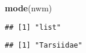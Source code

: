\documentclass[]{article}
\newenvironment{Shaded}{\begin{snugshade}}{\end{snugshade}}
\newcommand{\DecValTok}[1]{\textcolor[rgb]{0.00,0.00,0.81}{#1}}
\newcommand{\KeywordTok}[1]{\textcolor[rgb]{0.13,0.29,0.53}{\textbf{#1}}}
\newcommand{\NormalTok}[1]{#1}
\newcommand{\OperatorTok}[1]{\textcolor[rgb]{0.81,0.36,0.00}{\textbf{#1}}}
\begin{document}
\begin{Shaded}
\begin{Highlighting}[]
\KeywordTok{mode}\NormalTok{(nwm)}
\end{Highlighting}
\end{Shaded}

\begin{verbatim}
## [1] "list"
\end{verbatim}

\begin{Shaded}
\end{Shaded}

\begin{verbatim}
## [1] "Tarsiidae"
\end{verbatim}
\end{document}
